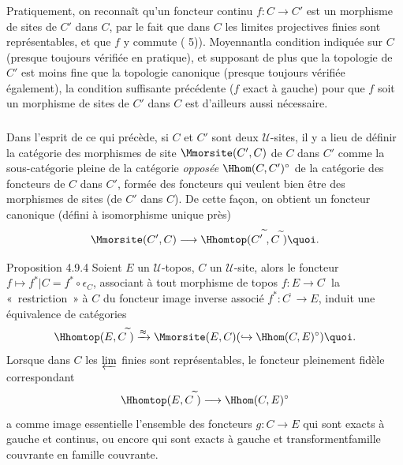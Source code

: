 \documentclass[10pt]{../fichiers-configuration-latex/smfart}
\begin{document}
\subsubsection{}
Pratiquement, on reconnaît qu'un foncteur continu $f:C\rightarrow
C'$ est un morphisme de sites de $C'$ dans $C$, par le fait que dans
$C$ les limites projectives finies sont représentables, et que $f$ y
commute ( 5)). Moyennant\pageoriginale la condition
indiquée sur $C$ (presque toujours vérifiée en pratique), et
supposant de plus que la topologie de $C'$ est moins fine que la
topologie canonique (presque toujours vérifiée également), la
condition suffisante précédente ($f$ exact à gauche) pour que $f$
soit un morphisme de sites de $C'$ dans $C$ est d'ailleurs aussi
nécessaire.

\subsubsection{}
Dans l'esprit de ce qui précède, si $C$ et $C'$ sont deux
$𝒰$-sites, il y a lieu de définir la catégorie des
morphismes de site $\Mmorsite(C',C)$ de $C$ dans $C'$ comme la
sous-catégorie pleine de la catégorie \emph{opposée
$\Hhom(C,C')^{\circ}$} de la catégorie des foncteurs de $C$ dans
$C'$, formée des foncteurs qui veulent bien être des morphismes
de sites (de $C'$ dans $C$). De cette façon, on obtient un
foncteur canonique (défini à isomorphisme unique près)
$$
\Mmorsite(C',C)\longrightarrow
\Hhomtop({C'}^{\widetilde{\phantom{,}}},
C^{\widetilde{\phantom{,}}}){\quoi}.
$$

\begin{enonce*}{Proposition 4.9.4}
Soient $E$ un $𝒰$-topos, $C$ un $𝒰$-site, alors le
foncteur $f\mapsto f^{\ast}| C=f^{\ast}\circ \epsilon_{C}$,
associant à tout morphisme de topos $f:E\rightarrow
C^{\widetilde{\phantom{,}}}$ la « restriction »  à $C$ du
foncteur image inverse associé
$f^{\ast}:C^{\widetilde{\phantom{,}}}\rightarrow E$, induit une
équivalence de catégories
$$
\Hhomtop(E,C^{\widetilde{\phantom{,}}})\xrightarrow{\approx}\Mmorsite(E,C)(\hookrightarrow
\Hhom(C,E)^{\circ}){\quoi}.
$$
Lorsque dans $C$ les $\varprojlim$ finies sont représentables, le
foncteur pleinement fidèle correspondant
$$
\Hhomtop(E,C^{\widetilde{\phantom{,}}})\longrightarrow
\Hhom(C,E)^{\circ}
$$
a comme image essentielle l'ensemble des foncteurs $g:C\rightarrow
E$ qui sont exacts à gauche et continus, ou encore qui sont exacts
à gauche et transforment\pageoriginale famille couvrante en
famille couvrante.
\end{enonce*}
\end{document}
